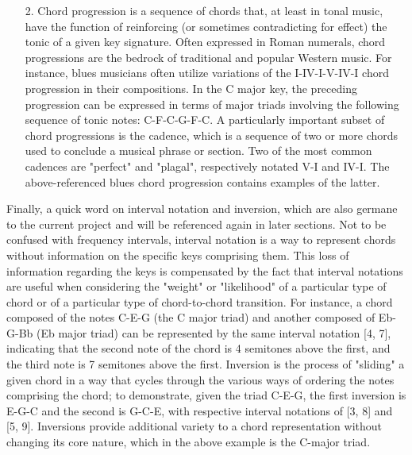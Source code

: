 \documentclass[twoside]{article}
\begin{document}
\begin{enumerate}
		\item[2.]
		Chord progression is a sequence of chords that, at least in tonal music, have the function of reinforcing (or sometimes contradicting for effect) the tonic of a given key signature. Often expressed in Roman numerals, chord progressions are the bedrock of traditional and popular Western music. For instance, blues musicians often utilize variations of the I-IV-I-V-IV-I chord progression in their compositions. In the C major key, the preceding progression can be expressed in terms of major triads involving the following sequence of tonic notes: C-F-C-G-F-C. A particularly important subset of chord progressions is the cadence, which is a sequence of two or more chords used to conclude a musical phrase or section. Two of the most common cadences are "perfect" and "plagal", respectively notated V-I and IV-I. The above-referenced blues chord progression contains examples of the latter.
	\end{enumerate}
	Finally, a quick word on interval notation and inversion, which are also germane to the current project and will be referenced again in later sections. Not to be confused with frequency intervals, interval notation is a way to represent chords without information on the specific keys comprising them. This loss of information regarding the keys is compensated by the fact that interval notations are useful when considering the "weight" or "likelihood" of a particular type of chord or of a particular type of chord-to-chord transition. For instance, a chord composed of the notes C-E-G (the C major triad) and another composed of Eb-G-Bb (Eb major triad) can be represented by the same interval notation [4, 7], indicating that the second note of the chord is 4 semitones above the first, and the third note is 7 semitones above the first. Inversion is the process of "sliding" a given chord in a way that cycles through the various ways of ordering the notes comprising the chord; to demonstrate, given the triad C-E-G, the first inversion is E-G-C and the second is G-C-E, with respective interval notations of [3, 8] and [5, 9]. Inversions provide additional variety to a chord representation without changing its core nature, which in the above example is the C-major triad.
	\\\\
\end{document}

